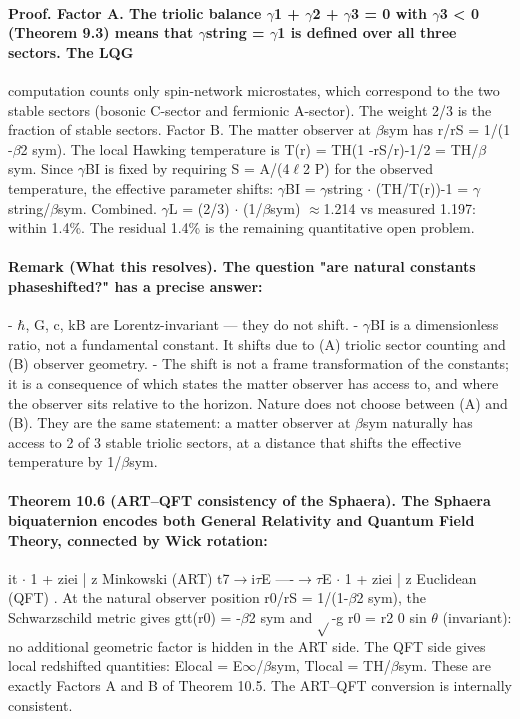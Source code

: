 \documentclass[12pt,a4paper]{article}
\begin{document}
\paragraph*{Proof. Factor A. The triolic balance $\gamma$1 + $\gamma$2 + $\gamma$3 = 0 with $\gamma$3 < 0 (Theorem 9.3) means that $\gamma$string = $\gamma$1 is defined over all three sectors. The LQG}
computation counts only spin-network microstates, which correspond to the two stable sectors (bosonic C-sector and fermionic A-sector). The weight 2/3 is the fraction of stable sectors. Factor B. The matter observer at $\beta$sym has r/rS = 1/(1 -$\beta$2 sym). The local Hawking temperature is T(r) = TH(1 -rS/r)-1/2 = TH/$\beta$sym. Since $\gamma$BI is fixed by requiring S = A/(4$\ell$2 P) for the observed temperature, the effective parameter shifts: $\gamma$BI = $\gamma$string $\cdot$ (TH/T(r))-1 = $\gamma$string/$\beta$sym. Combined. $\gamma$L = (2/3) $\cdot$ (1/$\beta$sym) $\approx$1.214 vs measured 1.197: within 1.4\%. The residual 1.4\% is the remaining quantitative open problem.
\paragraph*{Remark (What this resolves). The question "are natural constants phaseshifted?" has a precise answer:}
- $\hbar$, G, c, kB are Lorentz-invariant --- they do not shift.
- $\gamma$BI is a dimensionless ratio, not a fundamental constant. It shifts due to
(A) triolic sector counting and (B) observer geometry.
- The shift is not a frame transformation of the constants; it is a consequence of which states the matter observer has access to, and where the
observer sits relative to the horizon. Nature does not choose between (A) and (B). They are the same statement: a matter observer at $\beta$sym naturally has access to 2 of 3 stable triolic sectors, at a distance that shifts the effective temperature by 1/$\beta$sym.
\paragraph*{Theorem 10.6 (ART--QFT consistency of the Sphaera). The Sphaera biquaternion encodes both General Relativity and Quantum Field Theory, connected by Wick rotation:}
it $\cdot$ 1 + ziei | {z } Minkowski (ART) t7$\to$i$\tau$E ----$\to$$\tau$E $\cdot$ 1 + ziei | {z } Euclidean (QFT) . At the natural observer position r0/rS = 1/(1-$\beta$2 sym), the Schwarzschild metric gives gtt(r0) = -$\beta$2 sym and $\sqrt{}$-g
r0 = r2 0 sin $\theta$ (invariant): no additional geometric factor is hidden in the ART side. The QFT side gives local redshifted quantities: Elocal = E$\infty$/$\beta$sym, Tlocal = TH/$\beta$sym. These are exactly Factors A and B of Theorem 10.5. The ART--QFT conversion is internally consistent.
\end{document}

